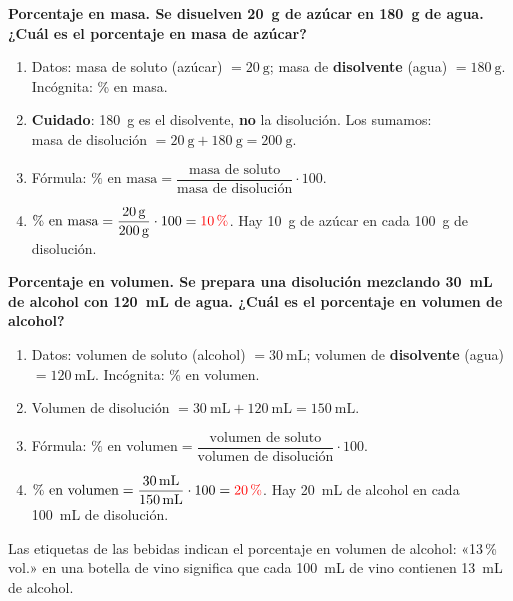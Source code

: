 \begin{example}
    \textbf{Porcentaje en masa. Se disuelven \qty{20}{\g} de azúcar en \qty{180}{\g} de agua. ¿Cuál es el porcentaje en masa de azúcar?}
    \begin{enumerate}[label=\numberballmDarkTeal]
        \item Datos: masa de soluto (azúcar) \(= \qty{20}{\g}\); masa de \textbf{disolvente} (agua) \(= \qty{180}{\g}\). Incógnita: \% en masa.
        \item \textbf{Cuidado}: \qty{180}{\g} es el disolvente, \textbf{no} la disolución. Los sumamos: \\
        masa de disolución \(= \qty{20}{\g} + \qty{180}{\g} = \qty{200}{\g}\).
        \item Fórmula: \(\%\text{ en masa} = \dfrac{\text{masa de soluto}}{\text{masa de disolución}} \cdot 100\).
        \item \(\%\text{ en masa} = \dfrac{\qty{20}{\g}}{\qty{200}{\g}} \cdot 100 = \textcolor{red}{\qty{10}{\percent}}\). Hay \qty{10}{\g} de azúcar en cada \qty{100}{\g} de disolución.
    \end{enumerate}
\end{example}

\begin{example}
    \textbf{Porcentaje en volumen. Se prepara una disolución mezclando \qty{30}{\mL} de alcohol con \qty{120}{\mL} de agua. ¿Cuál es el porcentaje en volumen de alcohol?}
    \begin{enumerate}[label=\numberballmDarkTeal]
        \item Datos: volumen de soluto (alcohol) \(= \qty{30}{\mL}\); volumen de \textbf{disolvente} (agua) \(= \qty{120}{\mL}\). Incógnita: \% en volumen.
        \item Volumen de disolución \(= \qty{30}{\mL} + \qty{120}{\mL} = \qty{150}{\mL}\).
        \item Fórmula: \(\%\text{ en volumen} = \dfrac{\text{volumen de soluto}}{\text{volumen de disolución}} \cdot 100\).
        \item \(\%\text{ en volumen} = \dfrac{\qty{30}{\mL}}{\qty{150}{\mL}} \cdot 100 = \textcolor{red}{\qty{20}{\percent}}\). Hay \qty{20}{\mL} de alcohol en cada \qty{100}{\mL} de disolución.
    \end{enumerate}
\end{example}

\begin{didyouknow}
    Las etiquetas de las bebidas indican el porcentaje en volumen de alcohol: «13\,\% vol.» en una botella de vino significa que cada \qty{100}{\mL} de vino contienen \qty{13}{\mL} de alcohol.
\end{didyouknow}

